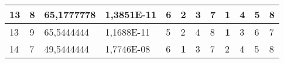 \documentclass[conference]{IEEEtran}
\begin{document}
\begin{table*}[]
\begin{tabular}{|llll|llllllll|}
\multicolumn{1}{|l|}{13}                                                    & \multicolumn{1}{l|}{8}                                                        & \multicolumn{1}{l|}{65,1777778}                                                   & 1,3851E-11                     & \multicolumn{1}{l|}{6}                                                  & \multicolumn{1}{l|}{2}                                                  & \multicolumn{1}{l|}{3}                                                  & \multicolumn{1}{l|}{7}                                                  & \multicolumn{1}{l|}{\textbf{1}}                                         & \multicolumn{1}{l|}{4}                                                  & \multicolumn{1}{l|}{5}                                                  & 8                          \\ \hline
\multicolumn{1}{|l|}{13}                                                    & \multicolumn{1}{l|}{9}                                                        & \multicolumn{1}{l|}{65,5444444}                                                   & 1,1688E-11                     & \multicolumn{1}{l|}{5}                                                  & \multicolumn{1}{l|}{2}                                                  & \multicolumn{1}{l|}{4}                                                  & \multicolumn{1}{l|}{8}                                                  & \multicolumn{1}{l|}{\textbf{1}}                                         & \multicolumn{1}{l|}{3}                                                  & \multicolumn{1}{l|}{6}                                                  & 7                          \\ \hline
\multicolumn{1}{|l|}{14}                                                    & \multicolumn{1}{l|}{7}                                                        & \multicolumn{1}{l|}{49,5444444}                                                   & 1,7746E-08                     & \multicolumn{1}{l|}{6}                                                  & \multicolumn{1}{l|}{\textbf{1}}                                         & \multicolumn{1}{l|}{3}                                                  & \multicolumn{1}{l|}{7}                                                  & \multicolumn{1}{l|}{2}                                                  & \multicolumn{1}{l|}{4}                                                  & \multicolumn{1}{l|}{5}                                                  & 8                          \\ \hline

\end{tabular}
\end{table*}
\end{document}
